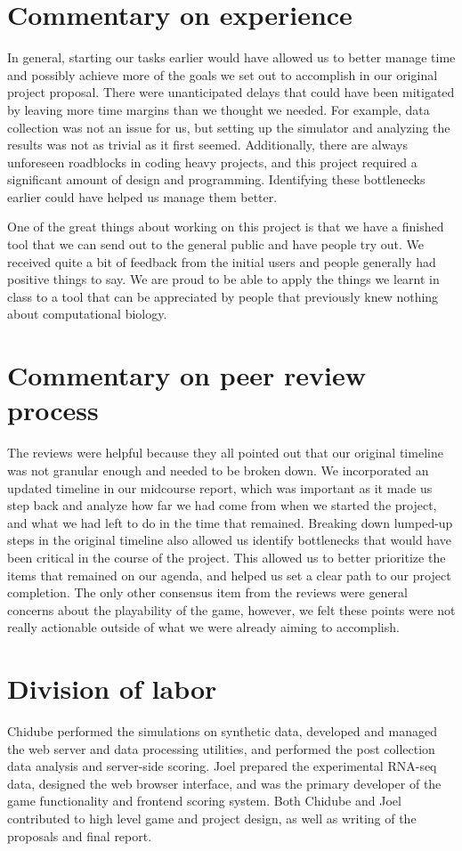 \documentclass[12pt]{article}
\begin{document}
\section*{Commentary on experience}

In general, starting our tasks earlier would have allowed us to better manage time and possibly achieve more of the goals we set out to accomplish in our original project proposal.
There were unanticipated delays that could have been mitigated by leaving more time margins than we thought we needed. For example, data collection was not an issue for us, but
setting up the simulator and analyzing the results was not as trivial as it first seemed. Additionally, there are always unforeseen roadblocks in coding heavy projects, and this project
required a significant amount of design and programming. Identifying these bottlenecks earlier could have helped us manage them better.

One of the great things about working on this project is that we have a finished tool that we can  send out to the general public and have people try out. We received quite a bit of feedback from the initial users and people generally had positive things to say. We are proud to be able to apply the things we learnt in class to a tool that can be appreciated by people that previously knew nothing about computational biology.

\section*{Commentary on peer review process}

The reviews were helpful because they all pointed out that our original timeline was not granular enough and needed to be broken down. We incorporated an updated timeline in our midcourse
report, which was important as it made us step back and analyze how far we had come from when we started the project, and what we had left to do in the time that remained. Breaking down lumped-up steps in the original timeline also allowed us identify bottlenecks that would have been critical in the course of the project. This
allowed us to better prioritize the items that remained on our agenda, and helped us set a clear path to our project completion. The only other consensus item from the reviews were general
concerns about the playability of the game, however, we felt these points were not really actionable outside of what we were already aiming to accomplish.

\section*{Division of labor}

Chidube performed the simulations on synthetic data, developed and managed the web server and data processing utilities, and performed the post collection data analysis and server-side scoring. Joel prepared the experimental RNA-seq data, designed the web browser interface, and was the primary developer of the game functionality and frontend scoring system. Both Chidube and Joel contributed to high level game and project design, as well as writing of the proposals and final report.


\end{document}
